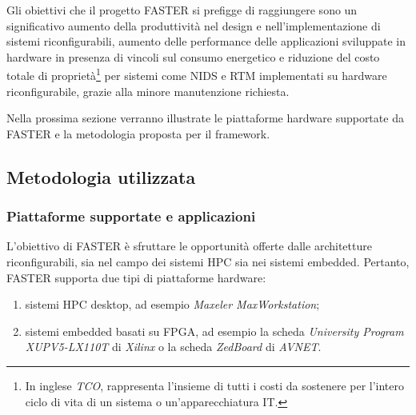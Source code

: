 Gli obiettivi che il progetto \ac{FASTER} si prefigge di raggiungere sono un 
significativo aumento della produttività nel design e nell'implementazione di 
sistemi riconfigurabili, aumento delle performance delle applicazioni 
sviluppate in hardware in presenza di vincoli sul consumo energetico e 
riduzione del costo totale di proprietà\footnote{In inglese \emph{\ac{TCO}}, 
rappresenta l'insieme di tutti i costi da sostenere per l'intero ciclo di 
vita di un sistema o un'apparecchiatura IT.} per sistemi come \ac{NIDS} e 
\ac{RTM} \cite{RTMArticle} implementati su hardware riconfigurabile, grazie alla minore 
manutenzione richiesta.

Nella prossima sezione verranno illustrate le piattaforme hardware supportate 
da \ac{FASTER} e la metodologia proposta per il framework.




\subsection{Metodologia utilizzata}
\label{sec:fasterMetodologia}

\subsubsection{Piattaforme supportate e applicazioni}
L'obiettivo di \ac{FASTER} è sfruttare le opportunità offerte dalle 
architetture riconfigurabili, sia nel campo dei sistemi \ac{HPC} sia nei 
sistemi embedded. Pertanto, \ac{FASTER} supporta due tipi di piattaforme 
hardware:
\begin{enumerate}
 \item sistemi \ac{HPC} desktop, ad esempio \emph{Maxeler MaxWorkstation};%
 \item sistemi embedded basati su \ac{FPGA}, ad esempio la 
scheda \emph{University Program XUPV5-LX110T} di \emph{Xilinx} o la scheda 
\emph{ZedBoard} di \emph{AVNET}.
\end{enumerate}

